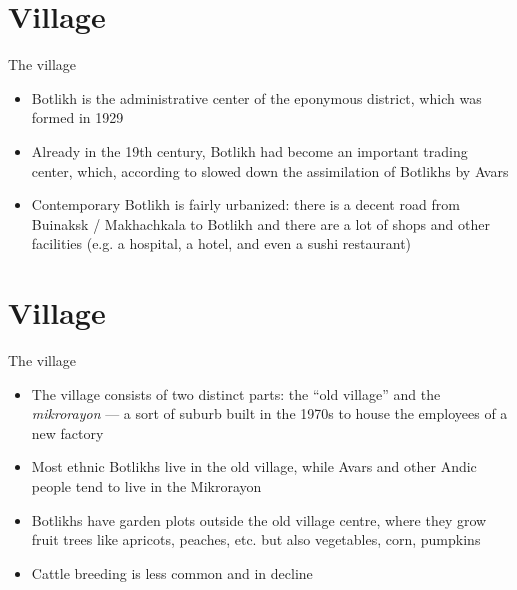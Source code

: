 \section{Village}
\begin{frame}{The village}
\begin{itemize}
    \item Botlikh is the administrative center of the eponymous district, which was formed in 1929
    \item Already in the 19th century, Botlikh had become an important trading center, which, according to \citep[59]{wixman1980} slowed down the assimilation of Botlikhs by Avars 
    \item Contemporary Botlikh is fairly urbanized: there is a decent road from Buinaksk / Makhachkala to Botlikh and there are a lot of shops and other facilities (e.g. a hospital, a hotel, and even a sushi restaurant)
    
\end{itemize}
\end{frame}


\section{Village}
\begin{frame}{The village}
\begin{itemize}
\item The village consists of two distinct parts: the ``old village'' and the \textit{mikrorayon} --- a sort of suburb built in the 1970s to house the employees of a new factory %
\item Most ethnic Botlikhs live in the old village, while Avars and other Andic people tend to live in the Mikrorayon
\item Botlikhs have garden plots outside the old village centre, where they grow fruit trees like apricots, peaches, etc. but also vegetables, corn, pumpkins
\item Cattle breeding is less common and in decline
\end{itemize}
\end{frame}

